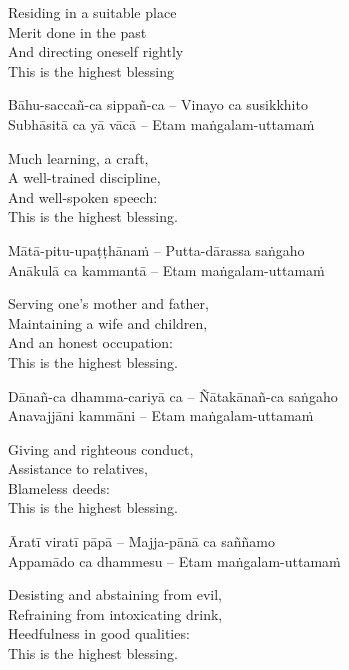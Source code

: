 \begin{english-verses}
  Residing in a suitable place\\
  Merit done in the past\\
  And directing oneself rightly\\
  This is the highest blessing
\end{english-verses}

Bāhu-saccañ-ca sippañ-ca – Vinayo ca susikkhito\\
Subhāsitā ca yā vācā – Etam maṅgalam-uttamaṁ

\begin{english-verses}
  Much learning, a craft,\\
  A well-trained discipline,\\
  And well-spoken speech:\\
  This is the highest blessing.
\end{english-verses}

Mātā-pitu-upaṭṭhānaṁ – Putta-dārassa saṅgaho\\
Anākulā ca kammantā – Etam maṅgalam-uttamaṁ

\begin{english-verses}
  Serving one's mother and father,\\
  Maintaining a wife and children,\\
  And an honest occupation:\\
  This is the highest blessing.
\end{english-verses}

Dānañ-ca dhamma-cariyā ca – Ñātakānañ-ca saṅgaho\\
Anavajjāni kammāni – Etam maṅgalam-uttamaṁ

\begin{english-verses}
  Giving and righteous conduct,\\
  Assistance to relatives,\\
  Blameless deeds:\\
  This is the highest blessing.
\end{english-verses}

Āratī viratī pāpā – Majja-pānā ca saññamo\\
Appamādo ca dhammesu – Etam maṅgalam-uttamaṁ

\begin{english-verses}
  Desisting and abstaining from evil,\\
  Refraining from intoxicating drink,\\
  Heedfulness in good qualities:\\
  This is the highest blessing.
\end{english-verses}

